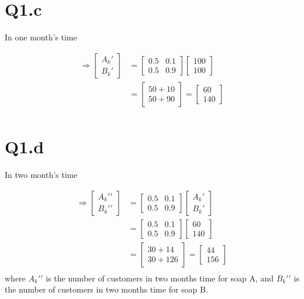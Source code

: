 \documentclass[10pt,a4paper]{article}
\numberwithin{equation}{section}
\begin{document}
	\section*{Q1.c}
	In one month's time
	
	
	\[\begin{aligned}\Rightarrow
	\begin{bmatrix}
		A_{k}{\prime}\\
		B_{k}{\prime} 
		\end{bmatrix}
		&=\begin{bmatrix}
		0.5 & 0.1 \\
		0.5 & 0.9
		\end{bmatrix}
		\begin{bmatrix}
		100 \\
		100
		\end{bmatrix}\\
		&=\begin{bmatrix}
		50 + 10 \\
		50 + 90
		\end{bmatrix}
		=\begin{bmatrix}
		60 \\
		140
		\end{bmatrix}\\	
		\end{aligned}
		\]
	\section*{Q1.d}
	In two month's time
		
		
		\[\begin{aligned}\Rightarrow
		\begin{bmatrix}
		A_{k}{\prime\prime}\\
		B_{k}{\prime\prime} 
		\end{bmatrix}
		&=\begin{bmatrix}
		0.5 & 0.1 \\
		0.5 & 0.9
		\end{bmatrix}
		\begin{bmatrix}
		A_{k}{\prime}\\
		B_{k}{\prime}
		\end{bmatrix}\\
		&=\begin{bmatrix}
		0.5 & 0.1 \\
		0.5 & 0.9
		\end{bmatrix}
		\begin{bmatrix}
		60 \\
		140
		\end{bmatrix}\\
		&=\begin{bmatrix}
		30 + 14 \\
		30 + 126
		\end{bmatrix}
		=\begin{bmatrix}
		44 \\
		156
		\end{bmatrix}\\	
		\end{aligned}
		\]
		where $A_{k}{\prime}{\prime}$ is the number of customers in two months time for soap A, and $B_{k}{\prime}{\prime}$ is the number of customers in two months time for soap B.
		
\end{document}
